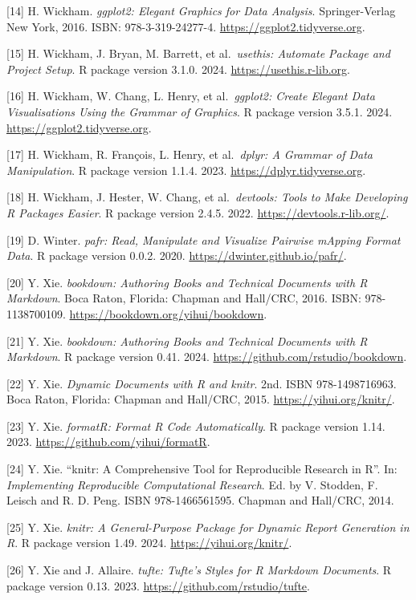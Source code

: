 \documentclass[
  12pt,
]{article}
\begin{document}
{[}14{]} H. Wickham. \emph{ggplot2: Elegant Graphics for Data Analysis}.
Springer-Verlag New York, 2016. ISBN: 978-3-319-24277-4.
\url{https://ggplot2.tidyverse.org}.

{[}15{]} H. Wickham, J. Bryan, M. Barrett, et al.~\emph{usethis: Automate
Package and Project Setup}. R package version 3.1.0. 2024.
\url{https://usethis.r-lib.org}.

{[}16{]} H. Wickham, W. Chang, L. Henry, et al.~\emph{ggplot2: Create Elegant
Data Visualisations Using the Grammar of Graphics}. R package version
3.5.1. 2024. \url{https://ggplot2.tidyverse.org}.

{[}17{]} H. Wickham, R. François, L. Henry, et al.~\emph{dplyr: A Grammar of
Data Manipulation}. R package version 1.1.4. 2023.
\url{https://dplyr.tidyverse.org}.

{[}18{]} H. Wickham, J. Hester, W. Chang, et al.~\emph{devtools: Tools to Make
Developing R Packages Easier}. R package version 2.4.5. 2022.
\url{https://devtools.r-lib.org/}.

{[}19{]} D. Winter. \emph{pafr: Read, Manipulate and Visualize Pairwise mApping
Format Data}. R package version 0.0.2. 2020.
\url{https://dwinter.github.io/pafr/}.

{[}20{]} Y. Xie. \emph{bookdown: Authoring Books and Technical Documents with R
Markdown}. Boca Raton, Florida: Chapman and Hall/CRC, 2016. ISBN:
978-1138700109. \url{https://bookdown.org/yihui/bookdown}.

{[}21{]} Y. Xie. \emph{bookdown: Authoring Books and Technical Documents with R
Markdown}. R package version 0.41. 2024.
\url{https://github.com/rstudio/bookdown}.

{[}22{]} Y. Xie. \emph{Dynamic Documents with R and knitr}. 2nd. ISBN
978-1498716963. Boca Raton, Florida: Chapman and Hall/CRC, 2015.
\url{https://yihui.org/knitr/}.

{[}23{]} Y. Xie. \emph{formatR: Format R Code Automatically}. R package version
1.14. 2023. \url{https://github.com/yihui/formatR}.

{[}24{]} Y. Xie. ``knitr: A Comprehensive Tool for Reproducible Research in
R''. In: \emph{Implementing Reproducible Computational Research}. Ed. by V.
Stodden, F. Leisch and R. D. Peng. ISBN 978-1466561595. Chapman and
Hall/CRC, 2014.

{[}25{]} Y. Xie. \emph{knitr: A General-Purpose Package for Dynamic Report
Generation in R}. R package version 1.49. 2024.
\url{https://yihui.org/knitr/}.

{[}26{]} Y. Xie and J. Allaire. \emph{tufte: Tufte's Styles for R Markdown
Documents}. R package version 0.13. 2023.
\url{https://github.com/rstudio/tufte}.
\end{document}
